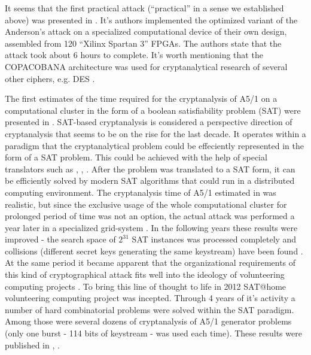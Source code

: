 \documentclass[runningheads,a4paper]{llncs}[2015/06/24]
\newcommand{\commentatside}[1]{\pdfcomment[color={0.045 0.278 0.643},icon=Note]{#1}}
\newcommand{\todo}[1]{\commentatside{#1}}
\begin{document}
It seems that the first practical attack (``practical'' in a sense we established
above) was presented in \cite{Guneysu:2008:CC:1446228.1446266}. It's authors implemented the optimized
variant of the Anderson's attack on a specialized computational device of their
own design, assembled from 120 ``Xilinx Spartan 3'' FPGAs. The authors state
\cite{Guneysu:2008:CC:1446228.1446266} that the attack took about 6 hours to complete. It's worth
mentioning that the COPACOBANA architecture was used for cryptanalytical
research of several other ciphers, e.g. DES \cite{COPAC_2}.

The first estimates of the time required for the cryptanalysis of A5/1 on a
computational cluster in the form of a boolean satisfiability problem (SAT)
\cite{HANDBOOK} were presented in \cite{PACO-2008}. SAT-based cryptanalysis is
considered a perspective direction of cryptanalysis that seems to be on the
rise for the last decade. It operates within a paradigm that the
cryptanalytical problem could be effeciently represented in the form of a SAT
problem. This could be achieved with the help of special translators such as
\cite{CRYPTOL}, \cite{URSA}, \cite{TRANSALG}. After the problem was translated
to a SAT form, it can be efficiently solved by modern SAT algorithms that could
run in a distributed computing environment. The cryptanalysis time of A5/1
estimated in \cite{PACO-2008} was realistic, but since the exclusive usage of
the whole computational cluster for prolonged period of time was not an option,
the actual attack was performed a year later in a specialized grid-system
\cite{TRUDY_ISA}. In the following years these results were improved - the
search space of $2^{31}$ SAT instances was processed completely and collisions
(different secret keys generating the same keystream) have been found
\cite{SZBP}. At the same period it became apparent that the organizational
requirements of this kind of cryptographical attack fits well into the ideology
of volunteering computing projects \todo{cite what?}. To bring this line of
thought to life in 2012 SAT@home \cite{SATHOME} volunteering computing project
was incepted. Through 4 years of it's activity a number of hard combinatorial
problems were solved within the SAT paradigm. Among those were several dozens
of cryptanalysis of A5/1 generator problems (only one burst - 114 bits of
keystream - was used each time). These results were published in
\cite{PACT_2015}, \cite{SPRINGER}.
\end{document}
